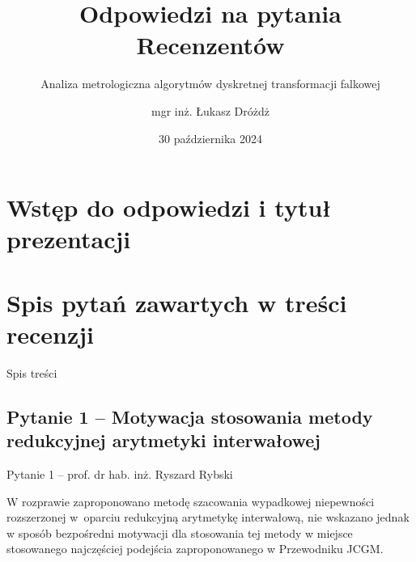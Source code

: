 \documentclass[12pt, polish, aspectratio = 169]{slides}
\title{Odpowiedzi na pytania Recenzentów}
\author{mgr inż. Łukasz Dróżdż}
\subtitle{Analiza metrologiczna algorytmów dyskretnej transformacji falkowej}
\institute{Politechnika Śląska, Wydział Elektryczny \\ Katedra Metrologii, Elektroniki i Automatyki}
\date{30 października 2024}
\begin{document}
\section*{Wstęp do odpowiedzi i tytuł prezentacji}

\begin{frame}[plain]
\titlepage
\end{frame}

\section*{Spis pytań zawartych w treści recenzji}

\begin{frame}{Spis treści}
\tableofcontents
\end{frame}


\subsection{Pytanie 1 -- Motywacja stosowania metody redukcyjnej arytmetyki interwałowej}

\begin{frame}{Pytanie 1 -- prof. dr hab. inż. Ryszard Rybski}\large
\begin{justify}
W rozprawie zaproponowano metodę szacowania wypadkowej niepewności rozszerzonej w oparciu redukcyjną arytmetykę interwałową, nie wskazano jednak w sposób bezpośredni motywacji dla stosowania tej metody w miejsce stosowanego najczęściej podejścia zaproponowanego w Przewodniku JCGM.
\end{justify}
\end{frame}
\end{document}
